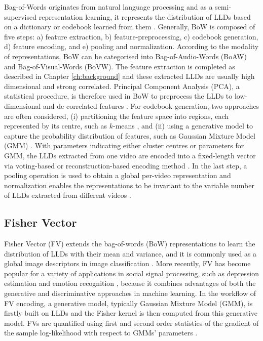 Bag-of-Words originates from natural language processing and as a semi-supervised representation learning, it represents the distribution of LLDs based on a dictionary or codebook learned from them \cite{csurka2004, peng2016}. Generally, BoW is composed of five steps: a) feature extraction, b) feature-preprocessing, c) codebook generation, d) feature encoding, and e) pooling and normalization. According to the modality of representations, BoW can be categorised into Bag-of-Audio-Words (BoAW) and Bag-of-Visual-Words (BoVW). The feature extraction is completed as described in Chapter \ref{ch:background} and these extracted LLDs are usually high dimensional and strong correlated. Principal Component Analysis (PCA), a statistical procedure, is therefore used in BoW to preprocess the LLDs to low-dimensional and de-correlated features \cite{peng2016}. For codebook generation, two approaches are often considered, (i) partitioning the feature space into regions, each represented by its centre, such as $k$-means \cite{bishop2006}, and (ii) using a generative model to capture the probability distribution of features, such as Gaussian Mixture Model (GMM) \cite{bishop2006}. With parameters indicating either cluster centres or parameters for GMM, the LLDs extracted from one video are encoded into a fixed-length vector via voting-based or reconstruction-based encoding method \cite{peng2016}. In the last step, a pooling operation is used to obtain a global per-video representation and normalization enables the representations to be invariant to the variable number of LLDs extracted from different videos \cite{peng2016}.

\subsection{Fisher Vector}

Fisher Vector (FV) extends the bag-of-words (BoW) representations to learn the distribution of LLDs with their mean and variance, and it is commonly used as a global image descriptors in image classification \cite{perronnin2010, krapac2011}. More recently, FV has become popular for a variety of applications in social signal processing, such as depression estimation \cite{jain2014, dhall2015} and emotion recognition \cite{kaya2015}, because it combines advantages of both the generative and discriminative approaches \cite{sanchez2013} in machine learning. In the workflow of FV encoding, a generative model, typically Gaussian Mixture Model (GMM), is firstly built on LLDs and the Fisher kernel is then computed from this generative model. FVs are quantified using first and second order statistics of the gradient of the sample log-likelihood with respect to GMMs' parameters \cite{sanchez2013}.

